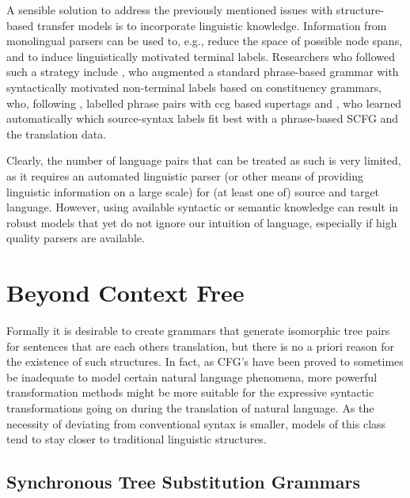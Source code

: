 A sensible solution to address the previously mentioned issues with structure-based transfer models is to incorporate linguistic knowledge. Information from monolingual parsers can be used to, e.g., reduce the space of possible node spans, and to induce linguistically motivated terminal labels. Researchers who followed such a strategy include \cite{zollmann2006syntax}, who augmented a standard phrase-based grammar with syntactically motivated non-terminal labels based on constituency grammars, \cite{almaghout2010ccg} who, following \cite{hassan2007supertagged}, labelled phrase pairs with ccg based supertags \citep{steedman2011combinatory} and \cite{mylonakis2011learning}, who learned automatically which source-syntax labels fit best with a phrase-based SCFG and the translation data.

Clearly, the number of language pairs that can be treated as such is very limited, as it requires an automated linguistic parser (or other means of providing linguistic information on a large scale) for (at least one of) source and target language. However, using available syntactic or semantic knowledge can result in robust models that yet do not ignore our intuition of language, especially if high quality parsers are available.

\section{Beyond Context Free}
\label{sec:bcf}

Formally it is desirable to create grammars that generate isomorphic tree pairs for sentences that are each others translation, but there is no a priori reason for the existence of such structures. In fact, as CFG's have been proved to sometimes be inadequate to model certain natural language phenomena, more powerful transformation methods might be more suitable for the expressive syntactic transformations going on during the translation of natural language. As the necessity of deviating from conventional syntax is smaller, models of this class tend to stay closer to traditional linguistic structures.

\subsection{Synchronous Tree Substitution Grammars}

